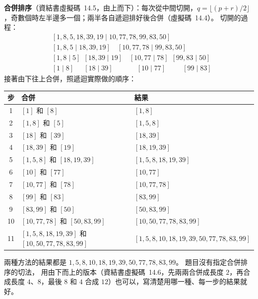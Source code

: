 \begin{pastsoln}
\textbf{合併排序}（資結書虛擬碼~14.5，由上而下）：每次從中間切開，$q = \lfloor (p + r)/2
\rfloor$，奇數個時左半邊多一個；兩半各自遞迴排好後合併（虛擬碼~14.4）。 切開的過程：
\[
\begin{aligned}
&[1, 8, 5, 18, 39, 19 \mid 10, 77, 78, 99, 83, 50] \\
&[1, 8, 5 \mid 18, 39, 19] \quad [10, 77, 78 \mid 99, 83, 50] \\
&[1, 8 \mid 5]\ \ [18, 39 \mid 19] \quad [10, 77 \mid 78]\ \ [99, 83 \mid 50] \\
&[1 \mid 8]\quad\ \ [18 \mid 39] \qquad\quad\ \ [10 \mid 77] \qquad\ \ [99 \mid 83]
\end{aligned}
\]
接著由下往上合併，照遞迴實際做的順序：
\begin{center}
\small
\begin{tabular}{cll}
\toprule
步 & 合併 & 結果 \\
\midrule
1 & $[1]$ 和 $[8]$ & $[1, 8]$ \\
2 & $[1, 8]$ 和 $[5]$ & $[1, 5, 8]$ \\
3 & $[18]$ 和 $[39]$ & $[18, 39]$ \\
4 & $[18, 39]$ 和 $[19]$ & $[18, 19, 39]$ \\
5 & $[1, 5, 8]$ 和 $[18, 19, 39]$ & $[1, 5, 8, 18, 19, 39]$ \\
6 & $[10]$ 和 $[77]$ & $[10, 77]$ \\
7 & $[10, 77]$ 和 $[78]$ & $[10, 77, 78]$ \\
8 & $[99]$ 和 $[83]$ & $[83, 99]$ \\
9 & $[83, 99]$ 和 $[50]$ & $[50, 83, 99]$ \\
10 & $[10, 77, 78]$ 和 $[50, 83, 99]$ & $[10, 50, 77, 78, 83, 99]$ \\
11 & $[1, 5, 8, 18, 19, 39]$ 和 $[10, 50, 77, 78, 83, 99]$ & $[1, 5, 8, 10, 18, 19, 39, 50, 77, 78, 83, 99]$ \\
\bottomrule
\end{tabular}
\end{center}
兩種方法的結果都是 $1, 5, 8, 10, 18, 19, 39, 50, 77, 78, 83, 99$。 題目沒有指定合併排序的切法，
用由下而上的版本（資結書虛擬碼~14.6，先兩兩合併成長度 $2$，再合成長度 $4$、$8$，最後 $8$ 和
$4$ 合成 $12$）也可以，寫清楚用哪一種、每一步的結果就好。


\end{pastsoln}
